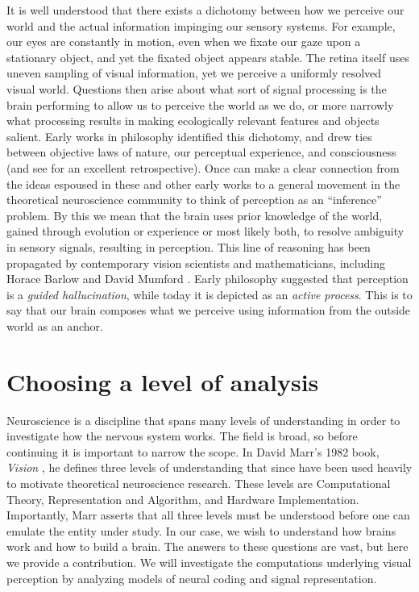 It is well understood that there exists a dichotomy between how we perceive our world and the actual information impinging our sensory systems. For example, our eyes are constantly in motion, even when we fixate our gaze upon a stationary object, and yet the fixated object appears stable. The retina itself uses uneven sampling of visual information, yet we perceive a uniformly resolved visual world. Questions then arise about what sort of signal processing is the brain performing to allow us to perceive the world as we do, or more narrowly what processing results in making ecologically relevant features and objects salient. Early works in philosophy identified this dichotomy, and drew ties between objective laws of nature, our perceptual experience, and consciousness \parencite{kant1790critique, helmholtz1878facts} (and see \parencite{westheimer2008helmholtz} for an excellent retrospective). Once can make a clear connection from the ideas espoused in these and other early works to a general movement in the theoretical neuroscience community to think of perception as an ``inference'' problem. By this we mean that the brain uses prior knowledge of the world, gained through evolution or experience or most likely both, to resolve ambiguity in sensory signals, resulting in perception. This line of reasoning has been propagated by contemporary vision scientists and mathematicians, including Horace Barlow \citeyearpar{barlow2001redundancy} and David Mumford \citeyearpar{mumford1994pattern}. Early philosophy suggested that perception is a \textit{guided hallucination}, while today it is depicted as an \textit{active process}. This is to say that our brain composes what we perceive using information from the outside world as an anchor.


\section{Choosing a level of analysis}
Neuroscience is a discipline that spans many levels of understanding in order to investigate how the nervous system works. The field is broad, so before continuing it is important to narrow the scope. In David Marr's 1982 book, \textit{Vision} \citeyearpar{marr1982vision}, he defines three levels of understanding that since have been used heavily to motivate theoretical neuroscience research. These levels are Computational Theory, Representation and Algorithm, and Hardware Implementation. Importantly, Marr asserts that all three levels must be understood before one can emulate the entity under study. In our case, we wish to understand how brains work and how to build a brain. The answers to these questions are vast, but here we provide a contribution. We will investigate the computations underlying visual perception by analyzing models of neural coding and signal representation.

